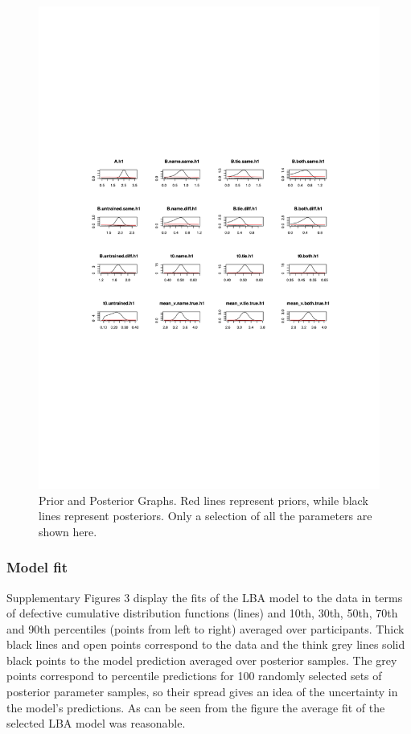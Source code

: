 \documentclass[
  man,floatsintext]{apa6}
\begin{document}
\begin{figure}[H]

{\centering \includegraphics[height=0.67\textheight,]{../../figures/ea/pp} 

}

\caption{Prior and Posterior Graphs. Red lines represent priors, while black lines represent posteriors. Only a selection of all the parameters are shown here.}\label{fig:prior-post-plot}
\end{figure}

\subsubsection{Model fit}\label{model-fit}

Supplementary Figures 3 display the fits of the LBA model to the data in terms of defective cumulative distribution functions (lines) and 10th, 30th, 50th, 70th and 90th percentiles (points from left to right) averaged over participants. Thick black lines and open points correspond to the data and the think grey lines solid black points to the model prediction averaged over posterior samples. The grey points correspond to percentile predictions for 100 randomly selected sets of posterior parameter samples, so their spread gives an idea of the uncertainty in the model's predictions. As can be seen from the figure the average fit of the selected LBA model was reasonable.
\end{document}
